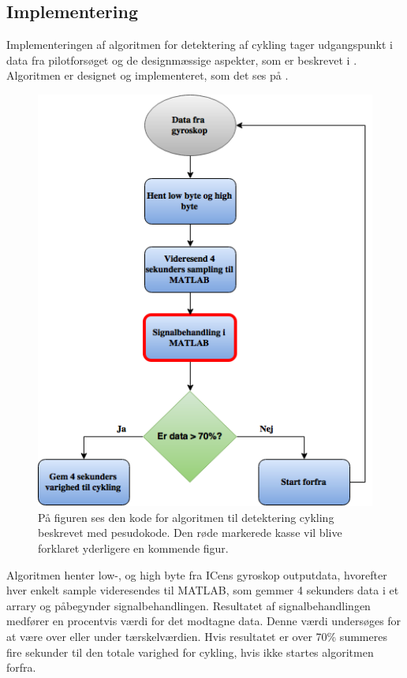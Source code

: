 \subsection{Implementering}
Implementeringen af algoritmen for detektering af cykling tager udgangspunkt i data fra pilotforsøget og de designmæssige aspekter, som er beskrevet i . Algoritmen er designet og implementeret, som det ses på .
\begin{figure}[H]
	\centering
	\includegraphics[scale=0.4]{figures/cDesign/Algoritme_cykling_basic.png}
	\caption{På figuren ses den kode for algoritmen til detektering cykling beskrevet med pesudokode. Den røde markerede kasse vil blive forklaret yderligere en kommende figur.}
	\label{fig:basic_cykling}
\end{figure}
Algoritmen henter low-, og high byte fra ICens gyroskop outputdata, hvorefter hver enkelt sample videresendes til MATLAB, som gemmer 4 sekunders data i et arrary og påbegynder signalbehandlingen. Resultatet af signalbehandlingen medfører en procentvis værdi for det modtagne data. Denne værdi undersøges for at være over eller under tærskelværdien. Hvis resultatet er over 70\% summeres fire sekunder til den totale varighed for cykling, hvis ikke startes algoritmen forfra.
